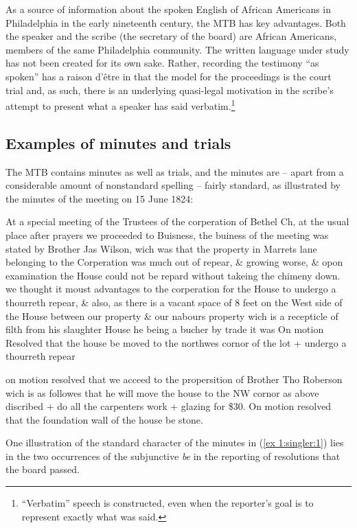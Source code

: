 \documentclass[output=paper,colorlinks,citecolor=brown]{langscibook}
\begin{document}
As a source of information about the spoken English of African Americans in Philadelphia in the early nineteenth century, the MTB has key advantages. Both the speaker and the scribe (the secretary of the board) are African Americans, members of the same Philadelphia community. The written language under study has not been created for its own sake. Rather, recording the testimony “as spoken” has a raison d’être in that the model for the proceedings is the court trial and, as such, there is an underlying quasi-legal motivation in the scribe’s attempt to present what a speaker has said verbatim.\footnote{{“Verbatim” speech is constructed, even when the reporter’s goal is to represent exactly what was said.}}

\subsection{Examples of minutes and trials}

The MTB contains minutes as well as trials, and the minutes are -- apart from a considerable amount of nonstandard spelling -- fairly standard, as illustrated by the minutes of the meeting on 15 June 1824:

\ea\label{ex 1:singler:1}
At a special meeting of the Trustees of the corperation of Bethel Ch, at the usual place after prayers we proceeded to Buisness, the buiness of the meeting was stated by Brother Jas Wilson, wich was that the property in Marrets lane belonging to the Corperation was much out of repear, \& growing worse, \& opon examination the House could not be repard without takeing the chimeny down. we thought it moust advantages to the corperation for the House to undergo a thourreth repear, \& also, as there is a vacant space of 8 feet on the West side of the House between our property \& our nabours property wich is a recepticle of filth from his slaughter House he being a bucher by trade it was On motion Resolved that the house be moved to the northwes cornor of the lot + undergo a thourreth repear

on motion resolved that we acceed to the propersition of Brother Tho Roberson wich is as followes that he will move the house to the NW cornor as above discribed + do all the carpenters work + glazing for \$30. On motion resolved that the foundation wall of the house be stone.  

\z

One illustration of the standard character of the minutes in (\ref{ex 1:singler:1}) lies in the two occurrences of the subjunctive \textit{be} in the reporting of resolutions that the board passed. 
\end{document}
